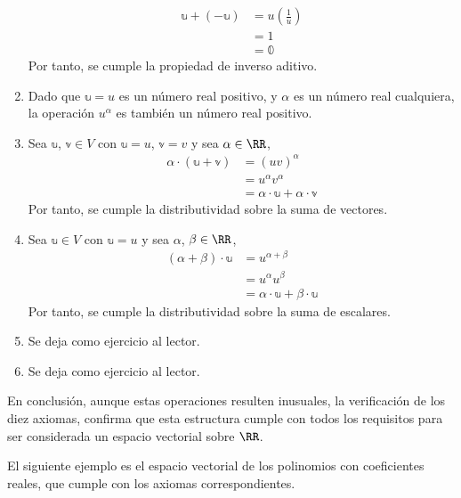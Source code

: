 \begin{examplebox}{}{}
\begin{enumerate}[label=\roman*), topsep=6pt, itemsep=0pt]
\begin{align*}
            \mathbb{u} + (-\mathbb{u}) & = u \left( \frac{1}{u} \right) \\
            & = 1 \\
            & = \mathbb{0}
        \end{align*}
        Por tanto, se cumple la propiedad de inverso aditivo.
        \item Dado que $\mathbb{u} = u$ es un número real positivo, y $\alpha$ es un número real cualquiera, la operación $u^{\alpha}$ es también un número real positivo.
        \item Sea $\mathbb{u}$, $\mathbb{v} \in V$ con $\mathbb{u} = u$, $\mathbb{v} = v$ y sea $\alpha \in \RR$,
        \begin{align*}
            \alpha \cdot (\mathbb{u} + \mathbb{v}) & = (uv)^{\alpha} \\
            & = u^{\alpha} v^{\alpha} \\
            & = \alpha \cdot \mathbb{u} + \alpha \cdot \mathbb{v}
        \end{align*}
        Por tanto, se cumple la distributividad sobre la suma de vectores.
        \item Sea $\mathbb{u} \in V$ con $\mathbb{u} = u$ y sea $\alpha$, $\beta \in \RR$,
        \begin{align*}
            (\alpha + \beta) \cdot \mathbb{u} & = u^{\alpha + \beta} \\
            & = u^{\alpha} u^{\beta} \\
            & = \alpha \cdot \mathbb{u} + \beta \cdot \mathbb{u}
        \end{align*}
        Por tanto, se cumple la distributividad sobre la suma de escalares.
        \item Se deja como ejercicio al lector.
        \item Se deja como ejercicio al lector.
    \end{enumerate}
    En conclusión, aunque estas operaciones resulten inusuales, la verificación de los diez axiomas, confirma que esta estructura cumple con todos los requisitos para ser considerada un espacio vectorial sobre $\RR$.
\end{examplebox}

El siguiente ejemplo es el espacio vectorial de los polinomios con coeficientes reales, que cumple con los axiomas correspondientes.

